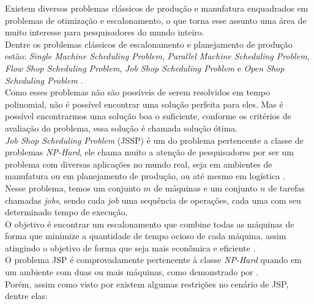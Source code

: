 
Existem diversos problemas clássicos de produção e manufatura enquadrados em problemas de otimização e escalonamento, o que torna esse assunto uma área de muito interesse para pesquisadores do mundo inteiro.\\
Dentre os problemas clássicos de escalonamento e planejamento de produção estão: 
\textit{Single Machine Scheduling Problem}, 
\textit{Parallel Machine Scheduling Problem}, 
\textit{Flow Shop Scheduling Problem}, 
\textit{Job Shop Scheduling Problem} e 
\textit{Open Shop Scheduling Problem} 
\cite{Allahverdi2008}.\\
Como esses problemas não são possíveis de serem resolvidos em tempo polinomial, não é possível encontrar uma solução perfeita para eles. Mas é possível encontrarmos uma solução boa o suficiente, conforme os critérios de avaliação do problema, essa solução é chamada solução ótima.\\
\textit{Job Shop Scheduling Problem} (JSSP) é um do problema pertencente a classe de problemas \textit{NP-Hard}, ele chama muito a atenção de pesquisadores por ser um problema com diversas aplicações no mundo real, seja em ambientes de manufatura ou em planejamento de produção, ou até mesmo em logística \cite{Cheng1996}.\\
Nesse problema, temos um conjunto $m$ de máquinas e um conjunto $n$ de tarefas chamadas \textit{jobs}, sendo cada \textit{job} uma sequência de operações, cada uma com seu determinado tempo de execução.\\ 
O objetivo é encontrar um escalonamento que combine todas as máquinas de forma que minimize a quantidade de tempo ocioso de cada máquina, assim atingindo o objetivo de forma que seja mais econômica e eficiente \cite{Cheng1996}.\\
O problema JSP é comprovadamente pertencente à classe \textit{NP-Hard} quando em um ambiente com duas ou mais máquinas, como demonstrado por \cite{Lenstra1979}.\\
Porém, assim como visto por \cite{Bagchi1999} existem algumas restrições no cenário de JSP, dentre elas:
